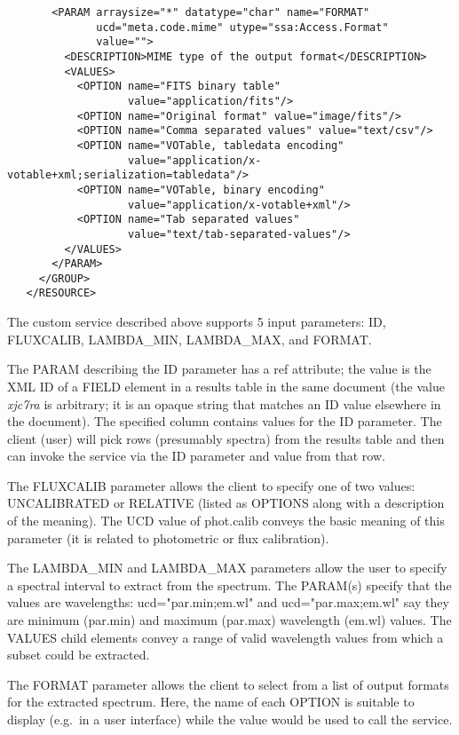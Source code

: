 \documentclass[11pt,a4paper]{ivoa}
\newcommand{\attval}[2]{#1={\allowbreak}{"}#2{"}}
\begin{document}
{\begin{verbatim}
       <PARAM arraysize="*" datatype="char" name="FORMAT"
              ucd="meta.code.mime" utype="ssa:Access.Format"
              value="">
         <DESCRIPTION>MIME type of the output format</DESCRIPTION>
         <VALUES>
           <OPTION name="FITS binary table"
                   value="application/fits"/>
           <OPTION name="Original format" value="image/fits"/>
           <OPTION name="Comma separated values" value="text/csv"/>
           <OPTION name="VOTable, tabledata encoding"
                   value="application/x-votable+xml;serialization=tabledata"/>
           <OPTION name="VOTable, binary encoding"
                   value="application/x-votable+xml"/>
           <OPTION name="Tab separated values"
                   value="text/tab-separated-values"/>
         </VALUES>
       </PARAM>
     </GROUP>
   </RESOURCE>
\end{verbatim}
}

The custom service described above supports 5 input parameters: ID,
FLUXCALIB, LAMBDA\_MIN, LAMBDA\_MAX, and FORMAT.

The PARAM describing the ID parameter has a ref attribute; the value is
the XML ID of a FIELD element in a results table in the same document
(the value {\em xjc7ra\/} is arbitrary;
it is an opaque string that matches
an ID value elsewhere in the document). The specified column contains
values for the ID parameter. The client (user) will pick rows (presumably
spectra) from the results table and then can invoke the service via the
ID parameter and value from that row.

The FLUXCALIB parameter allows the client to specify one of two values:
UNCALIBRATED or RELATIVE (listed as OPTIONS along with a description of
the meaning). The UCD \citep{2005ivoa.spec.0819D} value
of phot.calib conveys the basic meaning
of this parameter (it is related to photometric or flux calibration).

The LAMBDA\_MIN and LAMBDA\_MAX parameters allow the user to specify a
spectral interval to extract from the spectrum. The PARAM(s) specify that
the values are wavelengths:
\attval{ucd}{par.min;em.wl} and
\attval{ucd}{par.max;em.wl}
say they are minimum (par.min) and maximum (par.max) wavelength (em.wl)
values. The VALUES child elements convey a range of valid wavelength
values from which a subset could be extracted.

The FORMAT parameter allows the client to select from a list of output
formats for the extracted spectrum. Here, the name of each OPTION is
suitable to display (e.g.\ in a user interface) while the value would be
used to call the service.
\end{document}

